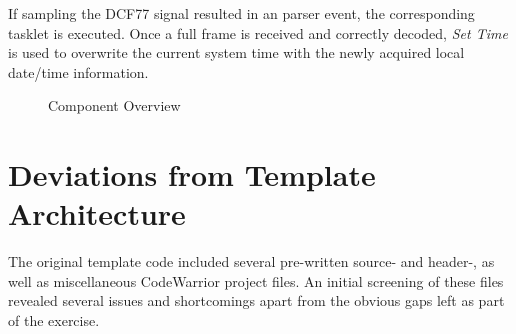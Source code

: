 If sampling the DCF77 signal resulted in an parser event, the corresponding tasklet is executed. Once a full frame is received and correctly decoded, \emph{Set Time} is used to overwrite the current system time with the newly acquired local date/time information.

\begin{figure}[ht]
    \centering

    \caption{Component Overview}\label{fig:module_overview}
\end{figure}

\section{Deviations from Template Architecture}\label{sec:deviations_from_template_architecture}

The original template code included several pre-written source- and header-, as well as miscellaneous CodeWarrior project files. An initial screening of these files revealed several issues and shortcomings apart from the obvious gaps left as part of the exercise.

